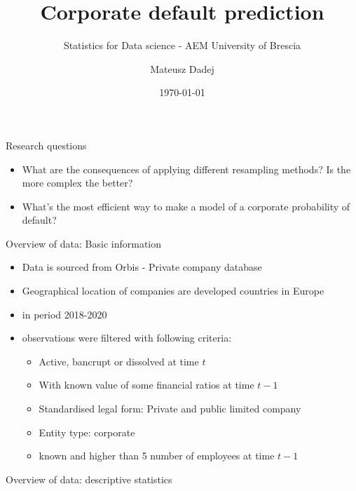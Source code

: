 \documentclass{beamer}
\title{Corporate default prediction}
\subtitle{Statistics for Data science - AEM University of Brescia}
\author{Mateusz Dadej}
\date{\today}
\begin{document}
\begin{frame}
\titlepage
\end{frame}

\begin{frame}{Research questions}
\begin{itemize}
\item What are the consequences of applying different resampling methods? Is the more complex the better?
\item What's the most efficient way to make a model of a corporate probability of default?
\end{itemize}
\end{frame}

\begin{frame}{Overview of data: Basic information}

\begin{itemize}
\item Data is sourced from Orbis - Private company database
\item Geographical location of companies are developed countries in Europe 
\item in period 2018-2020
\item observations were filtered with following criteria:
	\begin{itemize}
	\item Active, bancrupt or dissolved at time $t$
	\item With known value of some financial ratios at time $t-1$
	\item Standardised legal form: Private and public limited company
	\item Entity type: corporate
	\item known and higher than 5 number of employees at time $t-1$
	\end{itemize}

\end{itemize}

\end{frame}

\begin{frame}{Overview of data: descriptive statistics}


\end{frame}
\end{document}
